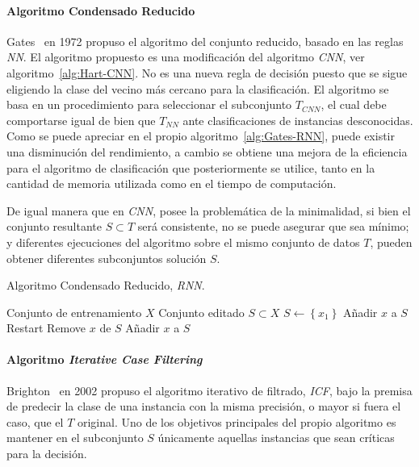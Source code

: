 \paragraph{Algoritmo Condensado Reducido}\label{paragraph:RNN}
\hfill \break
Gates~\cite{gates1972reduced} en 1972 propuso el algoritmo del conjunto reducido, basado en las reglas \textit{NN}. El algoritmo propuesto es una modificación del algoritmo \textit{CNN}, ver algoritmo~\ref{alg:Hart-CNN}. No es una nueva regla de decisión puesto que se sigue eligiendo la clase del vecino más cercano para la clasificación. 
El algoritmo se basa en un procedimiento para seleccionar el subconjunto $T_{CNN}$, el cual debe comportarse igual de bien que $T_{NN}$ ante clasificaciones de instancias desconocidas. Como se puede apreciar en el propio algoritmo~\ref{alg:Gates-RNN}, puede existir una disminución del rendimiento, a cambio se obtiene una mejora de la eficiencia para el algoritmo de clasificación que posteriormente se utilice, tanto en la cantidad de memoria utilizada como en el tiempo de computación.

De igual manera que en \textit{CNN}, posee la problemática de la minimalidad, si bien el conjunto resultante $S \subset T$ será consistente, no se puede asegurar que sea mínimo; y diferentes ejecuciones del algoritmo sobre el mismo conjunto de datos $T$, pueden obtener diferentes subconjuntos solución $S$.

\begin{algorithm}[H]
\caption{Algoritmo Condensado Reducido, \textit{RNN}.}\label{alg:Gates-RNN}
\begin{algorithmic}[1]
\Require Conjunto de entrenamiento $X$
\Ensure Conjunto editado $S \subset X$
\Statex
{}
	\State $S \leftarrow \left\lbrace x_1 \right\rbrace$
			\State Añadir $x$ a $S$
			\State Restart 
		\EndIf
	\EndFor
		\State Remove $x$ de $S$
			\State Añadir $x$ a $S$
		\EndIf
	\EndFor
\EndProcedure
\end{algorithmic}
\end{algorithm}




\paragraph{Algoritmo \textit{Iterative Case Filtering}}\label{subsubsub:ICF}
\hfill \break
Brighton~\cite{brighton2002advances} en 2002 propuso el algoritmo iterativo de filtrado, \textit{ICF}, bajo la premisa de predecir la clase de una instancia con la misma precisión, o mayor si fuera el caso, que el $T$ original. Uno de los objetivos principales del propio algoritmo es mantener en el subconjunto $S$ únicamente aquellas instancias que sean críticas para la decisión.

